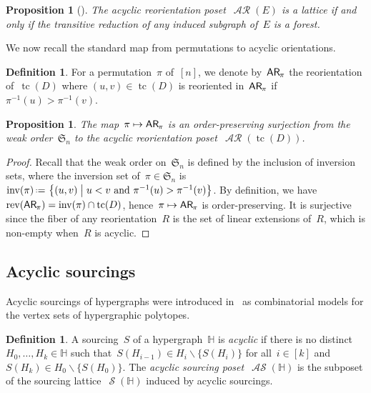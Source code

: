 \documentclass{amsart}
\newtheorem{proposition}[theorem]{Proposition}
\theoremstyle{definition}
\newtheorem{definition}[theorem]{Definition}
\renewcommand{\c}[1]{\mathcal{#1}} %
\newcommand{\set}[2]{\left\{ #1 \;\middle|\; #2 \right\}} %
\newcommand{\ssm}{\smallsetminus} %
\newcommand{\eqdef}{\mbox{\,\raisebox{0.2ex}{\scriptsize\ensuremath{\mathrm:}}\ensuremath{=}\,}} %
\DeclareMathOperator{\inv}{inv} %
\DeclareMathOperator{\tc}{tc} %
\newcommand{\darkblue}{\color{darkblue}} %
\newcommand{\defn}[1]{\textsl{\darkblue #1}} %
\newcommand{\fS}{\mathfrak{S}} %
\newcommand{\mymap}[2]{\mathsf{#1}_{\hspace{-.7pt}#2}}
\DeclareMathOperator{\AReori}{\c{AR}}  %
\newcommand{\areori}[1]{\mymap{AR}{#1}}  %
\DeclareMathOperator{\rev}{rev} %
\DeclareMathOperator{\Sour}{\mathcal{S}}  %
\DeclareMathOperator{\ASour}{\mathcal{AS}}  %
\newcommand{\HH}{\mathbb H}  %
\begin{document}
\begin{proposition}[{\cite[Thm.~1]{Pilaud-acyclicReorientationLattices}}]
\label{prop:acyclicReorientationLattices}
The acyclic reorientation poset~$\AReori(E)$ is a lattice if and only if the transitive reduction of any induced subgraph of~$E$ is a forest.
\end{proposition}

We now recall the standard map from permutations to acyclic orientations.

\begin{definition}
For a permutation~$\pi$ of~$[n]$, we denote by~$\areori{\pi}$ the reorientation of~$\tc(D)$ where $(u,v) \in \tc(D)$ is reoriented in~$\areori{\pi}$ if~$\pi^{-1}(u) > \pi^{-1}(v)$.
\end{definition}

\begin{proposition}
\label{prop:Perm2AReori}
The map~$\pi \mapsto \areori{\pi}$ is an order-preserving surjection from the weak order~$\fS_n$ to the acyclic reorientation poset~$\AReori(\tc(D))$.
\end{proposition}

\begin{proof}
Recall that the weak order on~$\fS_n$ is defined by the inclusion of inversion sets, where the inversion set of~$\pi \in \fS_n$ is~$\inv(\pi) \eqdef \set{(u,v)}{u < v \text{ and } \pi^{-1}(u) > \pi^{-1}(v)}$.
By definition, we have~$\rev(\areori{\pi}) = \inv(\pi) \cap \tc(D)$, hence~$\pi \mapsto \areori{\pi}$ is order-preserving.
It is surjective since the fiber of any reorientation~$R$ is the set of linear extensions of~$R$, which is non-empty when~$R$ is acyclic.
\end{proof}

\subsection{Acyclic sourcings}

Acyclic sourcings of hypergraphs were introduced in~\cite{BenedettiBergeronMachacek,BergeronPilaud} as combinatorial models for the vertex sets of hypergraphic polytopes.

\begin{definition}
\label{def:ASour}
A sourcing~$S$ of a hypergraph~$\HH$ is \defn{acyclic} if there is no distinct~$H_0, \dots, H_k \in \HH$ such that~$S(H_{i-1}) \in H_i \ssm \{S(H_i)\}$ for all~$i \in [k]$ and~$S(H_k) \in H_0 \ssm \{S(H_0)\}$.
The \defn{acyclic sourcing poset}~$\ASour(\HH)$ is the subposet of the sourcing lattice~$\Sour(\HH)$ induced by acyclic sourcings.
\end{definition}
\end{document}

